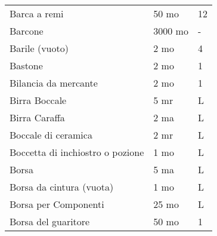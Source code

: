 \documentclass[12pt,a4paper,twoside,openany]{book}
\begin{document}
\begin{multicols}{2}
{\begin{tabularx}{0.42\textwidth}{lll}
Barca a remi& 50 mo  & 12\\
Barcone & 3000 mo  & -\\
Barile (vuoto)& 2 mo& 4\\
Bastone & 2 mo& 1\\
Bilancia da mercante  & 2 mo& 1\\
Birra Boccale& 5 mr& L\\
Birra Caraffa& 2 ma& L\\
Boccale di ceramica & 2 mr& L\\
Boccetta di inchiostro o pozione  & 1 mo& L \\
Borsa&5 ma&L\\
Borsa da cintura (vuota) & 1 mo& L\\
Borsa per Componenti &25 mo&L\\
Borsa del guaritore& 50 mo  & 1\\
\end{tabularx}

}
\end{multicols}
\end{document}
